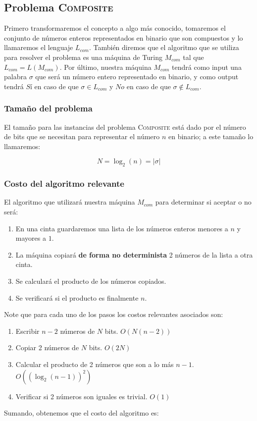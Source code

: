 \documentclass[spanish, draft]{article}
\begin{document}
\subsection{Problema \textsc{Composite}}
  Primero transformaremos el concepto a algo más conocido, tomaremos el conjunto de números enteros representados en binario que son compuestos y lo llamaremos el lenguaje $L_{com}$. También diremos que el algoritmo que se utiliza para resolver el problema es una máquina de Turing $M_{com}$ tal que $L_{com} = L(M_{com})$. Por último, nuestra máquina $M_{com}$ tendrá como input una palabra $\sigma$ que será un número entero representado en binario, y como output tendrá $Sí$ en caso de que $\sigma \in L_{com}$ y $No$ en caso de que $\sigma \notin L_{com}$.

  \subsubsection{Tamaño del problema}
  El tamaño para las instancias del problema \textsc{Composite} está dado por el número de bits que se necesitan para representar el número $n$ en binario; a este tamaño lo llamaremos:
      
  $$N = \log_2(n) = |\sigma|$$

  \subsubsection{Costo del algoritmo relevante}
  El algoritmo que utilizará nuestra máquina $M_{com}$ para determinar si aceptar o no será:
  \begin{enumerate}
    \item En una cinta guardaremos una lista de los números enteros menores a $n$ y mayores a $1$.
    \item La máquina copiará \textbf{de forma no determinista} 2 números de la lista a otra cinta.
    \item Se calculará el producto de los números copiados.
    \item Se verificará si el producto es finalmente $n$.
  \end{enumerate}
  Note que para cada uno de los pasos los costos relevantes asociados son:
  \begin{enumerate}
    \item Escribir $n - 2$ números de $N$ bits. $O(N(n-2))$
    \item Copiar 2 números de $N$ bits. $O(2N)$
    \item Calcular el producto de 2 números que son a lo más $n - 1$. $O((\log_2(n-1))^2)$
    \item Verificar si 2 números son iguales es trivial. $O(1)$
  \end{enumerate}
  Sumando, obtenemos que el costo del algoritmo es:
\end{document}
